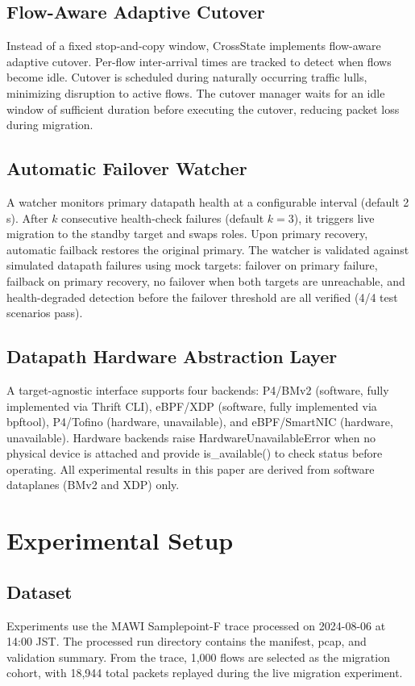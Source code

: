 \documentclass[10pt, conference]{IEEEtran}
\begin{document}
\subsection{Flow-Aware Adaptive Cutover}
\label{subsec:adaptive_cutover}
Instead of a fixed stop-and-copy window, CrossState implements flow-aware adaptive cutover. Per-flow inter-arrival times are tracked to detect when flows become idle. Cutover is scheduled during naturally occurring traffic lulls, minimizing disruption to active flows. The cutover manager waits for an idle window of sufficient duration before executing the cutover, reducing packet loss during migration.

\subsection{Automatic Failover Watcher}
\label{subsec:failover}
A watcher monitors primary datapath health at a configurable interval (default 2\,s). After $k$ consecutive health-check failures (default $k=3$), it triggers live migration to the standby target and swaps roles. Upon primary recovery, automatic failback restores the original primary. The watcher is validated against simulated datapath failures using mock targets: failover on primary failure, failback on primary recovery, no failover when both targets are unreachable, and health-degraded detection before the failover threshold are all verified (4/4 test scenarios pass).

\subsection{Datapath Hardware Abstraction Layer}
\label{subsec:hal}
A target-agnostic interface supports four backends: P4/BMv2 (software, fully implemented via Thrift CLI), eBPF/XDP (software, fully implemented via bpftool), P4/Tofino (hardware, unavailable), and eBPF/SmartNIC (hardware, unavailable). Hardware backends raise HardwareUnavailableError when no physical device is attached and provide is\_available() to check status before operating. All experimental results in this paper are derived from software dataplanes (BMv2 and XDP) only.

\section{Experimental Setup}
\label{sec:experimental_setup}

\subsection{Dataset}
\label{subsec:dataset}
Experiments use the MAWI Samplepoint-F trace processed on 2024-08-06 at 14:00 JST. The processed run directory contains the manifest, pcap, and validation summary. From the trace, 1{,}000 flows are selected as the migration cohort, with 18{,}944 total packets replayed during the live migration experiment.
\end{document}

